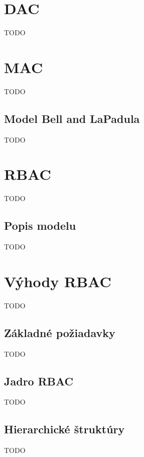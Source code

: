 \section{DAC}
TODO

\section{MAC}
TODO
\subsection{Model Bell and LaPadula}
TODO

\section{RBAC}
TODO
\subsection{Popis modelu}
TODO
\section{Výhody RBAC}
TODO
\subsection{Základné požiadavky}
TODO
\subsection{Jadro RBAC}
TODO
\subsection{Hierarchické štruktúry}
TODO












	


